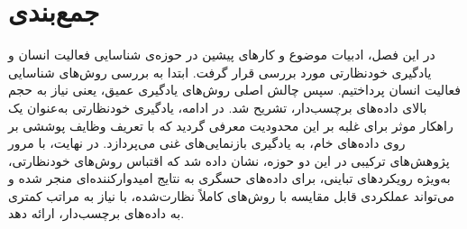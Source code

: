 \section{جمع‌بندی}

در این فصل، ادبیات موضوع و کارهای پیشین در حوزه‌ی شناسایی فعالیت انسان و یادگیری خودنظارتی مورد بررسی قرار گرفت. ابتدا به بررسی روش‌های شناسایی فعالیت انسان پرداختیم. سپس چالش اصلی روش‌های یادگیری عمیق، یعنی نیاز به حجم بالای داده‌های برچسب‌دار، تشریح شد. در ادامه، یادگیری خودنظارتی به‌عنوان یک راهکار موثر برای غلبه بر این محدودیت معرفی گردید که با تعریف وظایف پوششی بر روی داده‌های خام، به یادگیری بازنمایی‌های غنی می‌پردازد. در نهایت، با مرور پژوهش‌های ترکیبی در این دو حوزه، نشان داده شد که اقتباس روش‌های خودنظارتی، به‌ویژه رویکردهای تباینی، برای داده‌های حسگری به نتایج امیدوارکننده‌ای منجر شده و می‌تواند عملکردی قابل مقایسه با روش‌های کاملاً نظارت‌شده، با نیاز به مراتب کمتری به داده‌های برچسب‌دار، ارائه دهد.
